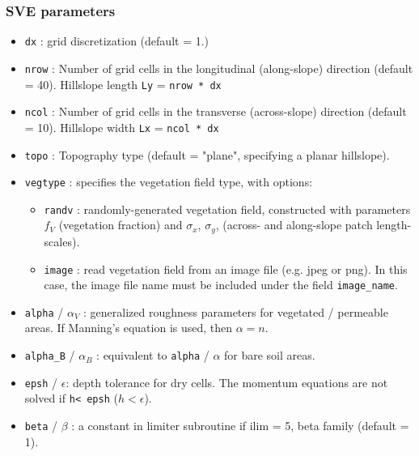 \documentclass{article}
\newcommand{\code}[1]{\texttt{#1}}
\begin{document}
\subsubsection*{SVE parameters}
\begin{itemize}
	\item \code{dx} : grid discretization (default = 1.)  
	\item \code{nrow} :  Number of grid cells in the longitudinal (along-slope) direction (default = 40).
		\subitem Hillslope length \code{Ly} = \code{nrow * dx} 
	\item \code{ncol} :  Number of grid cells in the transverse (across-slope) direction (default = 10).
	 	\subitem Hillslope width \code{Lx} = \code{ncol * dx} 
	 	
	\item \code{topo} : Topography type (default = "plane", specifying a planar hillslope). 

	\item \code{vegtype} : specifies the vegetation field type, with options:
		\begin{itemize}
		\item \code{randv} : randomly-generated vegetation field, constructed with parameters $f_V$ (vegetation fraction) and $\sigma_x$, $\sigma_y$, (across- and along-slope patch length-scales).
	    \item \code{image} : read vegetation field from an image file (e.g. jpeg or png). In this case, the image file name must be included under the field \code{image\_name}.
		\end{itemize}
	\item \code{alpha} / $\alpha_V$ : generalized roughness parameters for vegetated / permeable areas. If Manning's equation is used, then  $\alpha = n$.
	\item \code{alpha\_B} / $\alpha_B$ : equivalent to \code{alpha} / $\alpha$   for bare soil areas.
	\item \code{epsh} / $\epsilon$: depth tolerance for dry cells.  The momentum equations are not solved if \code{h< epsh} ($h<\epsilon$).
	\item \code{beta} / $\beta$ : a constant in limiter subroutine if ilim = 5, beta family (default = 1).   
\end{itemize}
\end{document}
